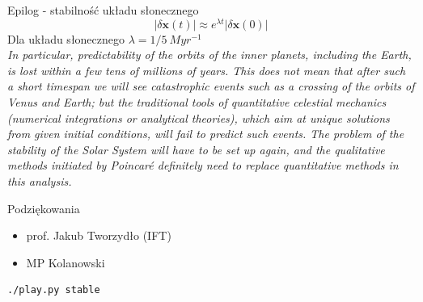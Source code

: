 \documentclass{beamer}
\begin{document}
\begin{frame}{Epilog - stabilność układu słonecznego}
	\begin{equation*}
	| \delta\mathbf{x}(t) | \approx e^{\lambda t} | \delta \mathbf{x}(0) |
	\end{equation*}
	\pause
	Dla układu słonecznego $\lambda = 1/5\ Myr^{-1}$ \cite{laskar1989numerical}\pause\\
	\textit{In particular, predictability of the orbits of the inner planets, including
	the Earth, is lost within a few tens of millions of years. This does not mean
	that after such a short timespan we will see catastrophic events such as a
	crossing of the orbits of Venus and Earth; but the traditional tools of
	quantitative celestial mechanics (numerical integrations or analytical
	theories), which aim at unique solutions from given initial conditions, will
	fail to predict such events. The problem of the stability of the Solar System
	will have to be set up again, and the qualitative methods initiated by Poincaré
	definitely need to replace quantitative methods in this analysis.}
\end{frame}

\begin{frame}
\nocite{ht_scholarpedia}
\nocite{stewart1994czy}
\nocite{ott2002chaos}
\nocite{ChaosBook}
{}

\end{frame}

\begin{frame}[fragile]
Podziękowania
\begin{itemize}
	\item prof. Jakub Tworzydło (IFT)
	\item MP Kolanowski
\end{itemize} 
\pause
\begin{lstlisting}
./play.py stable
\end{lstlisting}
\end{frame}
\end{document}
